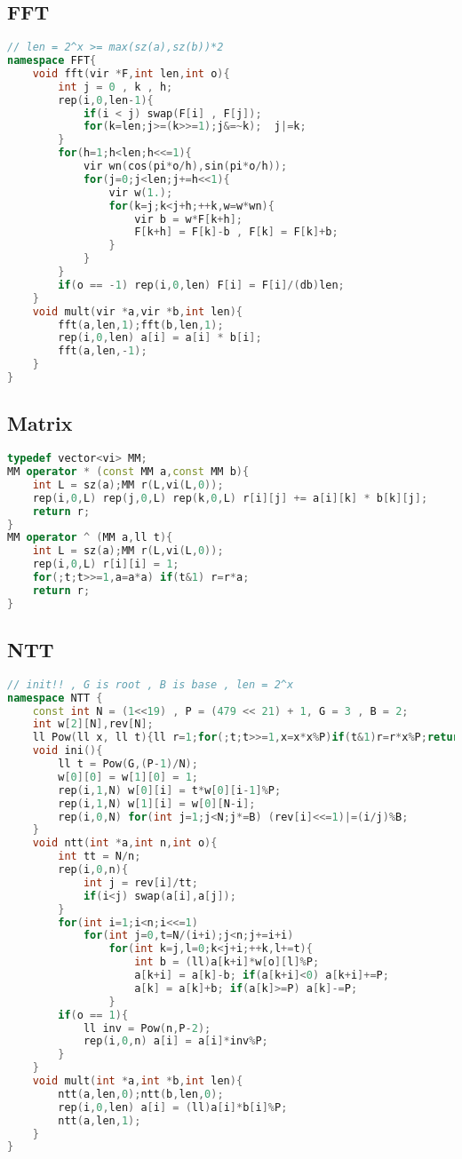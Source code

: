 \subsection{FFT}
\begin{lstlisting}[language=C++]
// len = 2^x >= max(sz(a),sz(b))*2
namespace FFT{
    void fft(vir *F,int len,int o){
        int j = 0 , k , h;
        rep(i,0,len-1){
            if(i < j) swap(F[i] , F[j]);
            for(k=len;j>=(k>>=1);j&=~k);  j|=k;
        }
        for(h=1;h<len;h<<=1){
            vir wn(cos(pi*o/h),sin(pi*o/h));
            for(j=0;j<len;j+=h<<1){
                vir w(1.);
                for(k=j;k<j+h;++k,w=w*wn){
                    vir b = w*F[k+h];
                    F[k+h] = F[k]-b , F[k] = F[k]+b;
                }
            }
        }
        if(o == -1) rep(i,0,len) F[i] = F[i]/(db)len;
    }
    void mult(vir *a,vir *b,int len){
        fft(a,len,1);fft(b,len,1);
        rep(i,0,len) a[i] = a[i] * b[i];
        fft(a,len,-1);
    }
}
\end{lstlisting}
\subsection{Matrix}
\begin{lstlisting}[language=C++]
typedef vector<vi> MM;
MM operator * (const MM a,const MM b){
    int L = sz(a);MM r(L,vi(L,0));
    rep(i,0,L) rep(j,0,L) rep(k,0,L) r[i][j] += a[i][k] * b[k][j];
    return r;
}
MM operator ^ (MM a,ll t){
    int L = sz(a);MM r(L,vi(L,0));
    rep(i,0,L) r[i][i] = 1;
    for(;t;t>>=1,a=a*a) if(t&1) r=r*a;
    return r;
}
\end{lstlisting}
\subsection{NTT}
\begin{lstlisting}[language=C++]
// init!! , G is root , B is base , len = 2^x
namespace NTT {
    const int N = (1<<19) , P = (479 << 21) + 1, G = 3 , B = 2;
    int w[2][N],rev[N];
    ll Pow(ll x, ll t){ll r=1;for(;t;t>>=1,x=x*x%P)if(t&1)r=r*x%P;return r;}
    void ini(){
        ll t = Pow(G,(P-1)/N);
        w[0][0] = w[1][0] = 1;
        rep(i,1,N) w[0][i] = t*w[0][i-1]%P;
        rep(i,1,N) w[1][i] = w[0][N-i];
        rep(i,0,N) for(int j=1;j<N;j*=B) (rev[i]<<=1)|=(i/j)%B;
    }
    void ntt(int *a,int n,int o){
        int tt = N/n;
        rep(i,0,n){
            int j = rev[i]/tt;
            if(i<j) swap(a[i],a[j]);
        }
        for(int i=1;i<n;i<<=1)
            for(int j=0,t=N/(i+i);j<n;j+=i+i)
                for(int k=j,l=0;k<j+i;++k,l+=t){
                    int b = (ll)a[k+i]*w[o][l]%P;
                    a[k+i] = a[k]-b; if(a[k+i]<0) a[k+i]+=P;
                    a[k] = a[k]+b; if(a[k]>=P) a[k]-=P;
                }
        if(o == 1){
            ll inv = Pow(n,P-2);
            rep(i,0,n) a[i] = a[i]*inv%P;
        }
    }
    void mult(int *a,int *b,int len){
        ntt(a,len,0);ntt(b,len,0);
        rep(i,0,len) a[i] = (ll)a[i]*b[i]%P;
        ntt(a,len,1);
    }
}
\end{lstlisting}
